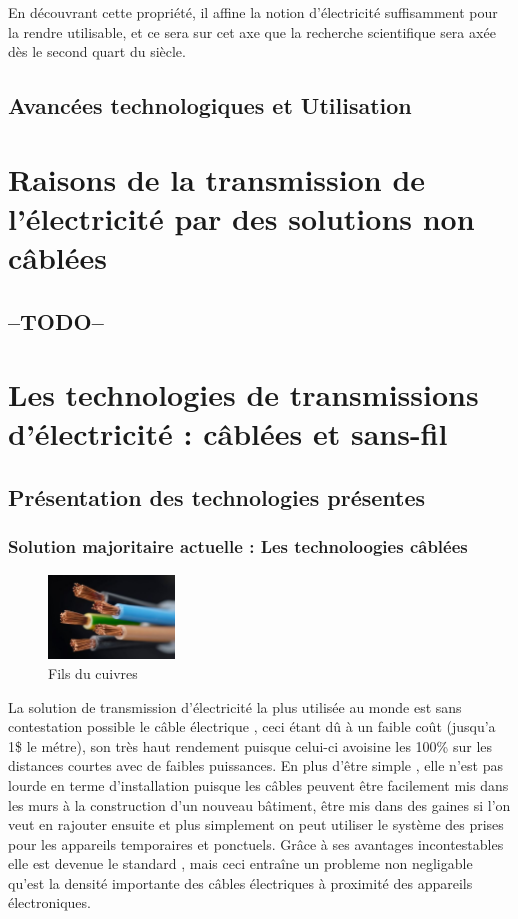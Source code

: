 \documentclass[12pt]{report}
\begin{document}
    En découvrant cette propriété, il affine la notion d'électricité suffisamment pour la rendre utilisable, et ce sera sur cet axe que la recherche scientifique sera axée dès le second quart du siècle.
\section{Avancées technologiques et Utilisation}

\chapter{Raisons de la transmission de l'électricité par des solutions non câblées} %
\section{--TODO--}

\chapter{Les technologies de transmissions d'électricité : câblées et sans-fil} %
\section{Présentation des technologies présentes}
\subsection{Solution majoritaire actuelle : Les technoloogies câblées}
\begin{figure}
  \begin{center}
    \includegraphics[width=0.3\textwidth]{copperWire}
  \end{center}
  \caption{Fils du cuivres}
\end{figure} La solution de transmission d'électricité la plus utilisée au monde est sans contestation possible le câble électrique , ceci étant dû à un faible coût (jusqu'a 1\$ le métre), son très haut rendement puisque celui-ci avoisine les 100\% sur les distances courtes avec de faibles puissances. En plus d'être simple , elle n'est pas lourde en terme d'installation puisque les câbles peuvent être facilement mis dans les murs à la construction d'un nouveau bâtiment, être mis dans des gaines si l'on veut en rajouter ensuite et plus simplement on peut utiliser le système des prises pour les appareils temporaires et ponctuels. Grâce à ses avantages incontestables elle est devenue le standard , mais ceci entraîne un probleme non negligable qu'est la densité importante des câbles électriques à proximité des appareils électroniques.
	
\end{document}
